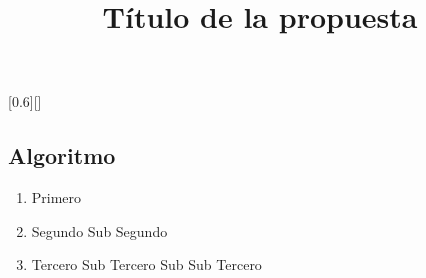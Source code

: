 \documentclass{PIA}
\title{Título de la propuesta}
\begin{document}
	\maketitle
	\Propuesta
	\DOO
	\DA
	[0.6][] %

	\subsection*{Algoritmo}
		\begin{enumerate}
			\item Primero
			\item Segundo
			\subitem	Sub Segundo
			\item Tercero
				\subitem Sub Tercero
					\subsubitem Sub Sub Tercero
		\end{enumerate}
\end{document}
